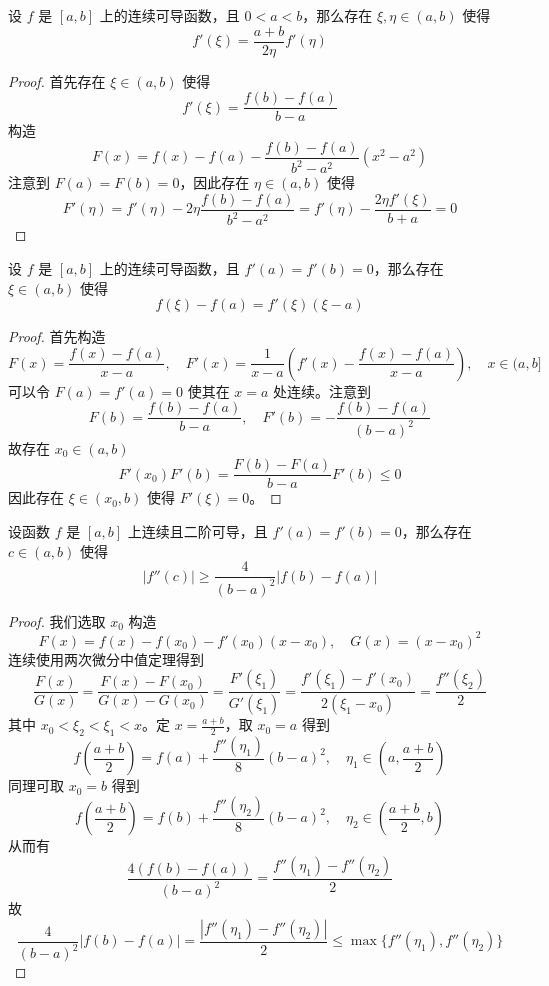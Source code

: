 \begin{problem}[000040]
设 $f$ 是 $[a,b]$ 上的连续可导函数，且 $0 < a < b$，那么存在 $\xi, \eta \in (a,b)$ 使得
\[ f'(\xi) = \frac{a+b}{2\eta}f'(\eta) \]
\end{problem}

\begin{proof}
	首先存在 $\xi \in (a,b)$ 使得
	\[ f'(\xi) = \frac{f(b) - f(a)}{b - a} \]
	构造
	\[ F(x) = f(x) - f(a) - \frac{f(b) - f(a)}{b^2 - a^2}(x^2 - a^2) \]
	注意到 $F(a) = F(b) = 0$，因此存在 $\eta \in (a, b)$ 使得
	\[ F'(\eta) = f'(\eta) - 2 \eta \frac{f(b) - f(a)}{b^2 - a^2} = f'(\eta) - \frac{2 \eta f'(\xi)}{b + a} = 0 \]
\end{proof}

\begin{problem}[000041]
设 $f$ 是 $[a,b]$ 上的连续可导函数，且 $f'(a) = f'(b) = 0$，那么存在 $\xi \in (a,b)$ 使得
\[ f(\xi) - f(a) = f'(\xi)(\xi - a) \]
\end{problem}

\begin{proof}
	首先构造
	\[ F(x) = \frac{f(x) - f(a)}{x - a}, \quad F'(x) = \frac{1}{x-a} \left(f'(x) - \frac{f(x) - f(a)}{x-a}\right), \quad x \in (a, b] \]
	可以令 $F(a) = f'(a) = 0$ 使其在 $x=a$ 处连续。注意到
	\[ F(b) = \frac{f(b) - f(a)}{b-a}, \quad F'(b) = -\frac{f(b) - f(a)}{(b-a)^2} \]
	故存在 $x_0 \in (a, b)$
	\[ F'(x_0) F'(b) = \frac{F(b) - F(a)}{b - a} F'(b) \leqslant 0 \]
	因此存在 $\xi \in (x_0, b)$ 使得 $F'(\xi) = 0$。
\end{proof}

\begin{problem}[000042]
设函数 $f$ 是 $[a,b]$ 上连续且二阶可导，且 $f'(a) = f'(b) = 0$，那么存在 $c \in (a,b)$ 使得
\[ |f''(c)| \geqslant \frac{4}{(b-a)^2} |f(b) - f(a)| \]
\end{problem}

\begin{proof}
	我们选取 $x_0$ 构造
	\[ F(x) = f(x) - f(x_0) - f'(x_0)(x-x_0) , \quad G(x) = (x-x_0)^2 \]
	连续使用两次微分中值定理得到
	\[ \frac{F(x)}{G(x)} = \frac{F(x) - F(x_0)}{G(x) - G(x_0)} = \frac{F'(\xi_1)}{G'(\xi_1)} = \frac{f'(\xi_1) - f'(x_0)}{2 (\xi_1 - x_0)} = \frac{f''(\xi_2)}{2} \]
	其中 $x_0 < \xi_2 < \xi_1 < x$。定 $x=\frac{a+b}{2}$，取 $x_0 = a$ 得到
	\[ f\left(\frac{a+b}{2}\right) = f(a) + \frac{f''(\eta_1)}{8} (b-a)^2, \quad \eta_1 \in \left(a, \frac{a+b}{2}\right) \]
	同理可取 $x_0 = b$ 得到
	\[ f\left(\frac{a+b}{2}\right) = f(b) + \frac{f''(\eta_2)}{8} (b-a)^2, \quad \eta_2 \in \left(\frac{a+b}{2}, b\right) \]
	从而有
	\[ \frac{4(f(b) - f(a))}{(b-a)^2} = \frac{f''(\eta_1) - f''(\eta_2)}{2} \]
	故
	\[ \frac{4}{(b-a)^2}|f(b) - f(a)| = \frac{|f''(\eta_1) - f''(\eta_2)|}{2} \leqslant \max\{f''(\eta_1), f''(\eta_2)\} \]
\end{proof}

